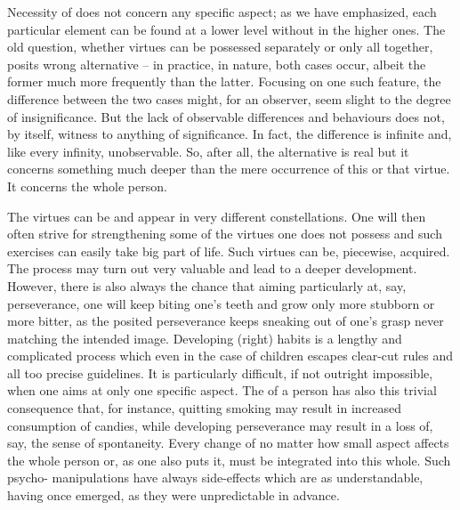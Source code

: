 Necessity of  does not concern any specific aspect; as
we have emphasized, each particular element can be found at a lower level without
 in the higher ones.  The old question, whether virtues
can be possessed separately or only all together, posits wrong alternative -- in
practice, in nature, both cases occur, albeit the former much more frequently
than the latter.  Focusing on one such feature, the difference between the two
cases might, for an  observer, seem slight to the degree of
insignificance. But the lack of  observable differences and
behaviours does not, by itself, witness to anything of significance. In fact,
the difference is infinite and, like every infinity, 
unobservable. So, after all, the alternative is real but it concerns something
much deeper than the mere occurrence of this or that virtue. It concerns the whole
person. 

The  virtues can be  and appear in very different
constellations.  One will then often strive for strengthening some of the
virtues one does not possess and such exercises can easily take big part of
life. Such virtues can be, piecewise, acquired. The process may turn out very
valuable and lead to a deeper development. However, there is also always the
chance that aiming particularly at, say, perseverance, one will keep biting
one's teeth and grow only more stubborn or more bitter, as the posited
perseverance keeps sneaking out of one's  grasp never matching the
intended image. Developing (right) habits is a lengthy and complicated process
which even in the case of children escapes clear-cut rules and all too precise
guidelines. It is particularly difficult, if not outright impossible, when one
aims at only one specific aspect. The  of a person has also this
trivial consequence that, for instance, quitting smoking may result in increased
consumption of candies, while developing perseverance may result in a loss of,
say, the sense of spontaneity. Every change of no matter how small aspect
affects the whole person or, as one also puts it, must be integrated into this
whole. Such psycho- manipulations have always side-effects which are
as understandable, having once emerged, as they were unpredictable in advance.

